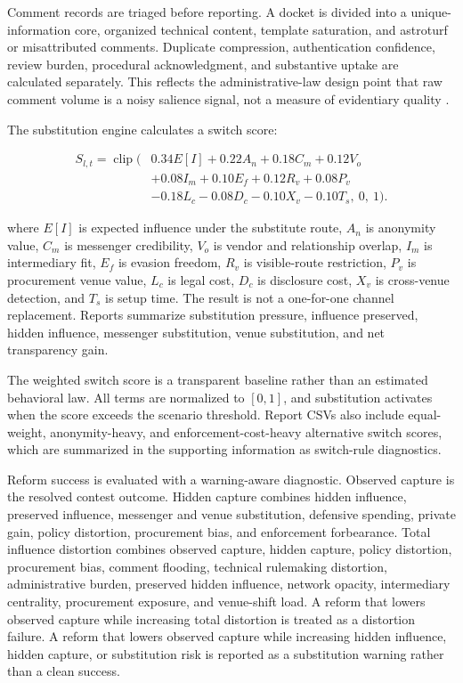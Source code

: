 Comment records are triaged before reporting. A docket is divided into a unique-information core, organized technical content, template saturation, and astroturf or misattributed comments. Duplicate compression, authentication confidence, review burden, procedural acknowledgment, and substantive uptake are calculated separately. This reflects the administrative-law design point that raw comment volume is a noisy salience signal, not a measure of evidentiary quality \citep{acusMassComments2021,nyagFakeComments2021}.

The substitution engine calculates a switch score:

\[
\begin{aligned}
S_{l,t} = \operatorname{clip}\bigl(&0.34E[I] + 0.22A_n + 0.18C_m + 0.12V_o\\
&+ 0.08I_m + 0.10E_f + 0.12R_v + 0.08P_v\\
&- 0.18L_c - 0.08D_c - 0.10X_v - 0.10T_s,\ 0,\ 1\bigr).
\end{aligned}
\]

where \(E[I]\) is expected influence under the substitute route, \(A_n\) is anonymity value, \(C_m\) is messenger credibility, \(V_o\) is vendor and relationship overlap, \(I_m\) is intermediary fit, \(E_f\) is evasion freedom, \(R_v\) is visible-route restriction, \(P_v\) is procurement venue value, \(L_c\) is legal cost, \(D_c\) is disclosure cost, \(X_v\) is cross-venue detection, and \(T_s\) is setup time. The result is not a one-for-one channel replacement. Reports summarize substitution pressure, influence preserved, hidden influence, messenger substitution, venue substitution, and net transparency gain.

The weighted switch score is a transparent baseline rather than an estimated behavioral law. All terms are normalized to \([0,1]\), and substitution activates when the score exceeds the scenario threshold. Report CSVs also include equal-weight, anonymity-heavy, and enforcement-cost-heavy alternative switch scores, which are summarized in the supporting information as switch-rule diagnostics.

Reform success is evaluated with a warning-aware diagnostic. Observed capture is the resolved contest outcome. Hidden capture combines hidden influence, preserved influence, messenger and venue substitution, defensive spending, private gain, policy distortion, procurement bias, and enforcement forbearance. Total influence distortion combines observed capture, hidden capture, policy distortion, procurement bias, comment flooding, technical rulemaking distortion, administrative burden, preserved hidden influence, network opacity, intermediary centrality, procurement exposure, and venue-shift load. A reform that lowers observed capture while increasing total distortion is treated as a distortion failure. A reform that lowers observed capture while increasing hidden influence, hidden capture, or substitution risk is reported as a substitution warning rather than a clean success.


